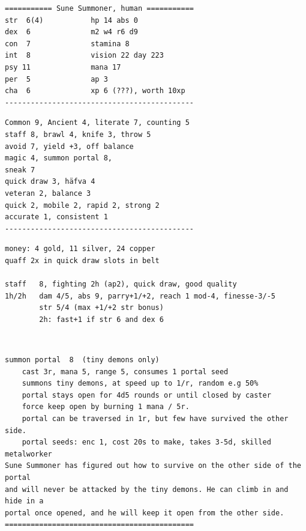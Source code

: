 \small \begin{samepage} \begin{verbatim}
=========== Sune Summoner, human ===========
str  6(4)           hp 14 abs 0
dex  6              m2 w4 r6 d9
con  7              stamina 8
int  8              vision 22 day 223
psy 11              mana 17
per  5              ap 3
cha  6              xp 6 (???), worth 10xp
--------------------------------------------
\end{verbatim} \end{samepage} \goodbreak \begin{samepage} \begin{verbatim}
Common 9, Ancient 4, literate 7, counting 5
staff 8, brawl 4, knife 3, throw 5
avoid 7, yield +3, off balance
magic 4, summon portal 8, 
sneak 7
quick draw 3, häfva 4
veteran 2, balance 3
quick 2, mobile 2, rapid 2, strong 2
accurate 1, consistent 1
--------------------------------------------
\end{verbatim} \end{samepage} \goodbreak \begin{samepage} \begin{verbatim}
money: 4 gold, 11 silver, 24 copper
quaff 2x in quick draw slots in belt

staff   8, fighting 2h (ap2), quick draw, good quality
1h/2h   dam 4/5, abs 9, parry+1/+2, reach 1 mod-4, finesse-3/-5
        str 5/4 (max +1/+2 str bonus)
        2h: fast+1 if str 6 and dex 6
\end{verbatim} \end{samepage}   \   \goodbreak \begin{samepage} \begin{verbatim}
summon portal  8  (tiny demons only)
    cast 3r, mana 5, range 5, consumes 1 portal seed
    summons tiny demons, at speed up to 1/r, random e.g 50%
    portal stays open for 4d5 rounds or until closed by caster
    force keep open by burning 1 mana / 5r.
    portal can be traversed in 1r, but few have survived the other side.
    portal seeds: enc 1, cost 20s to make, takes 3-5d, skilled metalworker
Sune Summoner has figured out how to survive on the other side of the portal
and will never be attacked by the tiny demons. He can climb in and hide in a
portal once opened, and he will keep it open from the other side.
============================================
\end{verbatim} \end{samepage} \normalsize

\

